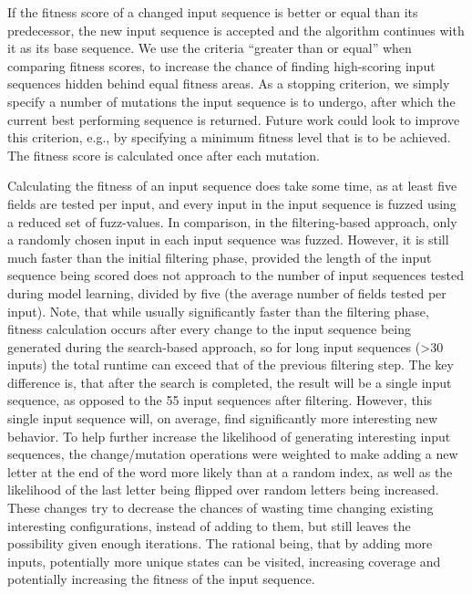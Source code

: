 If the fitness score of a changed input sequence is better or equal than its predecessor, the new input sequence is accepted and the algorithm continues with it as its base sequence. We use the criteria ``greater than or equal'' when comparing fitness scores, to increase the chance of finding high-scoring input sequences hidden behind equal fitness areas. As a stopping criterion, we simply specify a number of mutations the input sequence is to undergo, after which the current best performing sequence is returned. Future work could look to improve this criterion, e.g., by specifying a minimum fitness level that is to be achieved. The fitness score is calculated once after each mutation.

Calculating the fitness of an input sequence does take some time, as at least five fields are tested per input, and every input in the input sequence is fuzzed using a reduced set of fuzz-values. In comparison, in the filtering-based approach, only a randomly chosen input in each input sequence was fuzzed. However, it is still much faster than the initial filtering phase, provided the length of the input sequence being scored does not approach to the number of input sequences tested during model learning, divided by five (the average number of fields tested per input). Note, that while usually significantly faster than the filtering phase, fitness calculation occurs after every change to the input sequence being generated during the search-based approach, so for long input sequences (>30 inputs) the total runtime can exceed that of the previous filtering step. The key difference is, that after the search is completed, the result will be a single input sequence, as opposed to the 55 input sequences after filtering. However, this single input sequence will, on average, find significantly more interesting new behavior. To help further increase the likelihood of generating interesting input sequences, the change/mutation operations were weighted to make adding a new letter at the end of the word more likely than at a random index, as well as the likelihood of the last letter being flipped over random letters being increased. These changes try to decrease the chances of wasting time changing existing interesting configurations, instead of adding to them, but still leaves the possibility given enough iterations. The rational being, that by adding more inputs, potentially more unique states can be visited, increasing coverage and potentially increasing the fitness of the input sequence. \\

